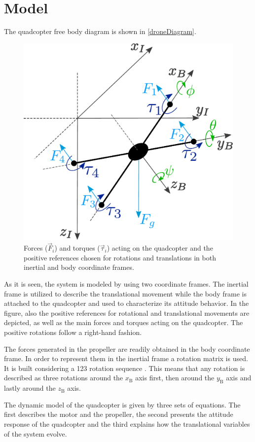 \section{Model}\label{sec:model}
The quadcopter free body diagram is shown in \autoref{droneDiagram}. 
\begin{figure}[H]
	\centering
	\includegraphics[width=.4\textwidth]{figures/droneDiagram}
	\caption{Forces ($\vec{F}_i$) and torques ($\vec{\tau}_i$) acting on the quadcopter and the positive references chosen for rotations and translations in both inertial and body coordinate frames.}
	\label{droneDiagram}
\end{figure}
%
As it is seen, the system is modeled by using two coordinate frames. The inertial frame is utilized to describe the translational movement while the body frame is attached to the quadcopter and used to characterize its attitude behavior. In the figure, also the positive references for rotational and translational movements are depicted, as well as the main forces and torques acting on the quadcopter. The positive rotations follow a right-hand fashion.

The forces generated in the propeller are readily obtained in the body coordinate frame. In order to represent them in the inertial frame a rotation matrix is used. It is built considering a 123 rotation sequence \cite{rotationmatrix}. This means that any rotation is described as three rotations around the $x_\mathrm{B}$ axis first, then around the $y_\mathrm{B}$ axis and lastly around the $z_\mathrm{B}$ axis. 
 
The dynamic model of the quadcopter is given by three sets of equations. The first describes the motor and the propeller, the second presents the attitude response of the quadcopter and the third explains how the translational variables of the system evolve.


